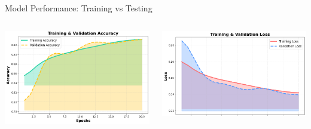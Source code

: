 \begin{frame}{Model Performance: Training vs Testing}

    \begin{columns}

        \centering
        \includegraphics[width=1\linewidth]{images/paper_3/accuracy plot.png} %

        \centering
        \includegraphics[width=1\linewidth]{images/paper_3/loss plot.png} %

    \end{columns}

\end{frame}



